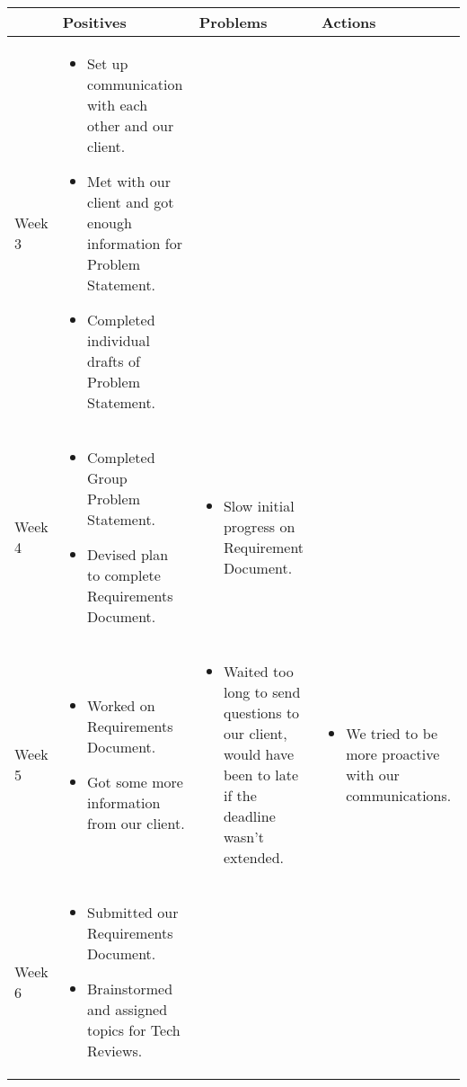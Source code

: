 \documentclass[onecolumn, draftclsnofoot,10pt, compsoc]{IEEEtran}
\begin{document}
\begin{longtable}{p{} | p{} | p{} | p{}}
        \textbf{ }
        & \textbf{Positives}
        & \textbf{Problems}
        & \textbf{Actions}
        \\\hline
        Week 3
        &   \begin{itemize}
                \item Set up communication with each other and our client.
                \item Met with our client and got enough information for Problem Statement.
                \item Completed individual drafts of Problem Statement.
            \end{itemize}
        &
        &
        \\Week 4
        &   \begin{itemize}
                \item Completed Group Problem Statement.
                \item Devised plan to complete Requirements Document.
            \end{itemize}
        &   \begin{itemize}
                \item Slow initial progress on Requirement Document.
            \end{itemize}
        &
        \\Week 5
        &   \begin{itemize}
                \item Worked on Requirements Document.
                \item Got some more information from our client.
            \end{itemize}
        &   \begin{itemize}
                \item Waited too long to send questions to our client, would have been to late if the deadline wasn't extended.
            \end{itemize}
        &   \begin{itemize}
                \item We tried to be more proactive with our communications.
            \end{itemize}
        \\Week 6
        &   \begin{itemize}
                \item Submitted our Requirements Document.
                \item Brainstormed and assigned topics for Tech Reviews.

\end{itemize}
\end{longtable}
\end{document}
